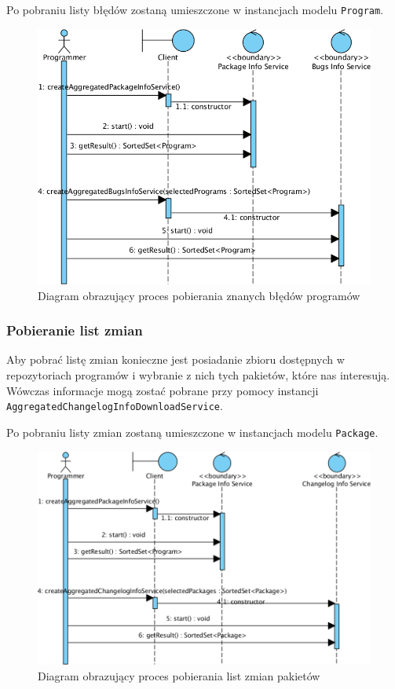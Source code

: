 \documentclass[polish,12pt,titlepage]{article}
\begin{document}
Po pobraniu listy błędów zostaną umieszczone w instancjach modelu
\texttt{Program}.

\begin{figure}[!ht]
\centering
\includegraphics[bb=0 0 765 587, scale=0.40]{BugsSequence.png}
\caption{Diagram obrazujący proces pobierania znanych błędów programów}
\end{figure}

\subsubsection{Pobieranie list zmian}

Aby pobrać listę zmian konieczne jest posiadanie zbioru dostępnych w
repozytoriach programów i wybranie z nich tych pakietów, które nas interesują.
Wówczas informacje mogą zostać pobrane przy pomocy instancji
\texttt{AggregatedChangelogInfoDownloadService}.

Po pobraniu listy zmian zostaną umieszczone w instancjach modelu
\texttt{Package}.

\begin{figure}[!ht]
\centering
\includegraphics[bb=0 0 892 572, scale=0.40]{ChangelogSequence.png}
\caption{Diagram obrazujący proces pobierania list zmian pakietów}
\end{figure}
\end{document}
